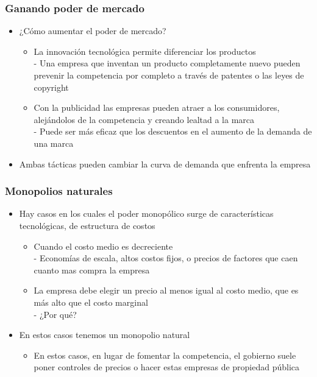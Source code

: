 \documentclass{beamer}
\begin{document}
\begin{frame}
\frametitle{ Ganando poder de mercado}
\begin{itemize}
    \item ¿Cómo aumentar el poder de mercado?
    \begin{itemize}
        \item La innovación tecnológica permite diferenciar los productos \\
        - Una empresa que inventan un producto completamente nuevo pueden prevenir la competencia por completo a través de patentes o las leyes de copyright
        \item Con la publicidad las empresas pueden atraer a los consumidores, alejándolos de la competencia y creando lealtad a la marca \\      - Puede ser más eficaz que los descuentos en el aumento de la demanda de una marca
        \end{itemize}
        \item Ambas tácticas pueden cambiar la curva de demanda que enfrenta la empresa
\end{itemize}
\end{frame}

\begin{frame}
\frametitle{Monopolios naturales}
\begin{itemize}
    \item Hay casos en los cuales el poder monopólico surge de características tecnológicas, de estructura de costos
    \begin{itemize}
        \item Cuando el costo medio es decreciente \\
        - Economías de escala, altos costos fijos, o precios de factores que caen cuanto mas compra la empresa
        \item La empresa debe elegir un precio al menos igual al costo medio, que es más alto que el costo marginal \\
        - ¿Por qué?
        \end{itemize}
    \item En estos casos tenemos un monopolio natural
    \begin{itemize}
        \item En estos casos, en lugar de fomentar la competencia, el gobierno suele poner controles de precios o hacer estas empresas de propiedad pública
    \end{itemize}
    \end{itemize}
\end{frame}
\end{document}
